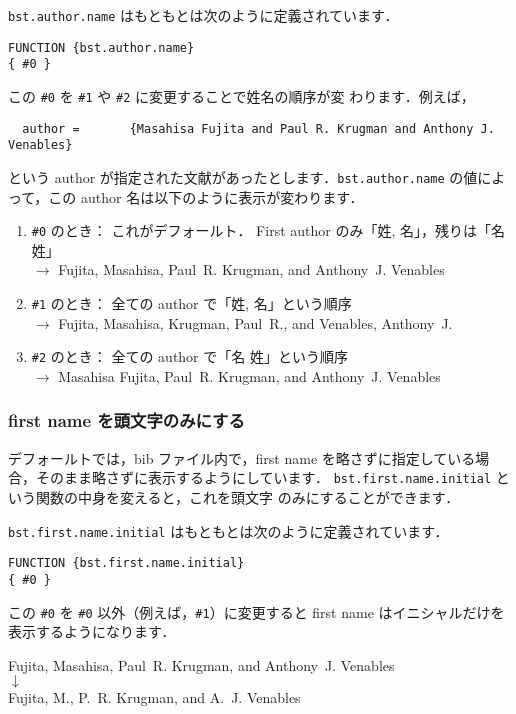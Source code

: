 \documentclass[a4j,10pt]{jarticle}
\begin{document}
\texttt{bst.author.name} はもともとは次のように定義されています．
\begin{screen}
\begin{verbatim}
FUNCTION {bst.author.name}
{ #0 }
\end{verbatim}
\end{screen}
この \verb|#0| を \verb|#1| や \verb|#2| に変更することで姓名の順序が変
わります．例えば，
\begin{verbatim}
  author =       {Masahisa Fujita and Paul R. Krugman and Anthony J. Venables}
\end{verbatim}
という author が指定された文献があったとします．\texttt{bst.author.name} 
の値によって，この author 名は以下のように表示が変わります．
\begin{enumerate}
 \item \verb|#0| のとき： これがデフォールト． First author のみ「姓, 
       名」，残りは「名 姓」\\
       $\rightarrow$ Fujita, Masahisa, Paul~R. Krugman, and
       Anthony~J. Venables
 \item \verb|#1| のとき： 全ての author で「姓, 名」という順序\\
       $\rightarrow$ Fujita, Masahisa, Krugman, Paul~R., and Venables, Anthony~J.
 \item \verb|#2| のとき： 全ての author で「名 姓」という順序\\
       $\rightarrow$ Masahisa Fujita, Paul~R. Krugman, and Anthony~J. Venables
\end{enumerate}

\subsubsection{first name を頭文字のみにする}

デフォールトでは，bib ファイル内で，first name を略さずに指定している場
合，そのまま略さずに表示するようにしています．
\texttt{bst.first.name.initial} という関数の中身を変えると，これを頭文字
のみにすることができます．

\texttt{bst.first.name.initial} はもともとは次のように定義されています．
\begin{screen}
\begin{verbatim}
FUNCTION {bst.first.name.initial}
{ #0 }
\end{verbatim}
\end{screen}
この \verb|#0| を \verb|#0| 以外（例えば，\verb|#1|）に変更すると
first name はイニシャルだけを表示するようになります．
\begin{center}
Fujita, Masahisa, Paul~R. Krugman, and Anthony~J. Venables \\
 $\downarrow$ \\
Fujita, M., P.~R. Krugman, and A.~J. Venables
\end{center}
\end{document}
